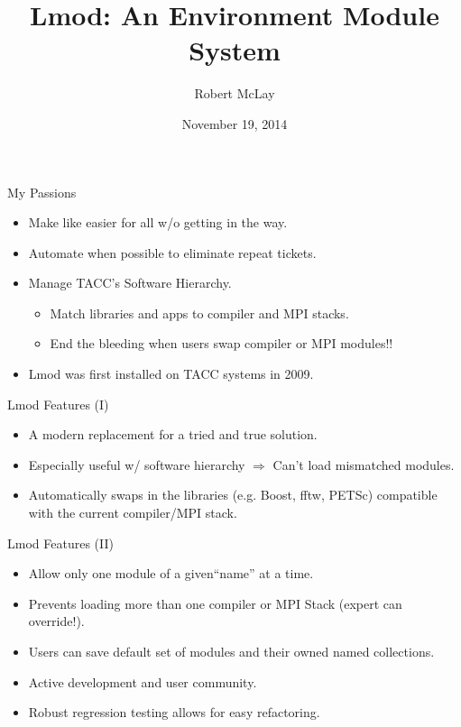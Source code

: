 \documentclass{beamer}
\title{Lmod: An Environment Module System}
\author{Robert McLay}
\institute{The Texas Advanced Computing Center}
\date{November 19, 2014}  %
\begin{document}
\begin{frame}
  \titlepage
\end{frame}

\begin{frame}{My Passions}
  \begin{itemize}
    \item Make like easier for all w/o getting in the way.
    \item Automate when possible to eliminate repeat tickets.
    \item Manage TACC's Software Hierarchy.
      \begin{itemize}
        \item Match libraries and apps to compiler and MPI stacks.
        \item End the bleeding  when users swap compiler or MPI modules!!
      \end{itemize}
    \item Lmod was first installed on TACC systems in 2009.

  \end{itemize}
\end{frame}

\begin{frame}{Lmod Features (I)}
  \begin{itemize}
    \item A modern replacement for a tried and true solution.
    \item Especially useful w/ software hierarchy $\Rightarrow$ Can't
      load mismatched modules.
    \item Automatically swaps in the libraries (e.g. Boost, fftw,
      PETSc) compatible with the current compiler/MPI stack.
  \end{itemize}
\end{frame}

\begin{frame}{Lmod Features (II)}
  \begin{itemize}
    \item Allow only one module of a given``name'' at a time.
    \item Prevents loading more than one compiler or
      MPI Stack (expert can override!).
    \item Users can save default set of modules and their owned  named collections.
    \item Active development and user community.
    \item Robust regression testing allows for easy refactoring.
  \end{itemize}
\end{frame}
\end{document}
